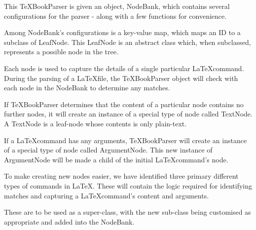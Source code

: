 		This \TeX BookParser is given an object, NodeBank, which contains several configurations for the parser - along with a few functions for convenience.
		
		Among NodeBank's configurations is a key-value map, which maps an ID to a subclass of LeafNode. This LeafNode is an abstract class which, when subclassed, represents a possible node in the tree.
		
		Each node is used to capture the details of a single particular \LaTeX command. During the parsing of a \LaTeX file, the \TeX BookParser object will check with each node in the NodeBank to determine any matches.
		
		If \TeX BookParser determines that the content of a particular node contains no further nodes, it will create an instance of a special type of node called TextNode. A TextNode is a leaf-node whose contents is only plain-text.
		
		If a \LaTeX command has any arguments, \TeX BookParser will create an instance of a special type of node called ArgumentNode. This new instance of ArgumentNode will be made a child of the initial \LaTeX command's node.
		
		To make creating new nodes easier, we have identified three primary different types of commands in \LaTeX. These will contain the logic required for identifying matches and capturing a \LaTeX command's content and arguments.
		
		These are to be used as a super-class, with the new sub-class being customised as appropriate and added into the NodeBank.
		
